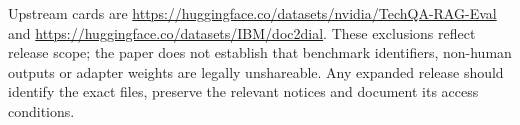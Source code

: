 Upstream cards are \url{https://huggingface.co/datasets/nvidia/TechQA-RAG-Eval} and \url{https://huggingface.co/datasets/IBM/doc2dial}. These exclusions reflect release scope; the paper does not establish that benchmark identifiers, non-human outputs or adapter weights are legally unshareable. Any expanded release should identify the exact files, preserve the relevant notices and document its access conditions.
